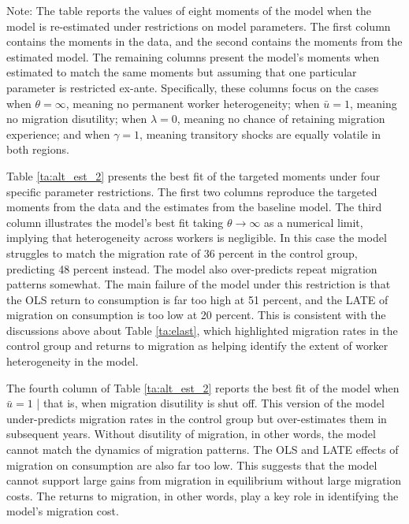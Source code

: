\documentclass[12pt,pdftex]{article}
\begin{document}
\begin{table}[t]
\parbox[c]{6.75in}{\vspace{0.1cm}
{\footnotesize  Note: The table reports the values of eight moments of the model when the model is re-estimated under restrictions on model parameters. The first column contains the moments in the data, and the second contains the moments from the estimated model. The remaining columns present the model's moments when estimated to match the same moments but assuming that one particular parameter is restricted ex-ante. Specifically, these columns focus on the cases when $\theta = \infty$, meaning no permanent worker heterogeneity; when $\bar u = 1$, meaning no migration disutility; when  $\lambda = 0$, meaning no chance of retaining migration experience; and when $\gamma = 1$, meaning transitory shocks are equally volatile in both regions.}}
\end{table}













Table \ref{ta:alt_est_2} presents the best fit of the targeted moments under four specific parameter restrictions. The first two columns reproduce the targeted moments from the data and the estimates from the baseline model. The third column illustrates the model's best fit taking $\theta \rightarrow \infty$ as a numerical limit, implying that heterogeneity across workers is negligible. In this case the model struggles to match the migration rate of 36 percent in the control group, predicting 48 percent instead. The model also over-predicts repeat migration patterns somewhat. The main failure of the model under this restriction is that the OLS return to consumption is far too high at 51 percent, and the LATE of migration on consumption is too low at 20 percent. This is consistent with the discussions above about Table \ref{ta:elast}, which highlighted migration rates in the control group and returns to migration as helping identify the extent of worker heterogeneity in the model.

The fourth column of Table \ref{ta:alt_est_2} reports the best fit of the model when $\bar u = 1$ | that is, when migration disutility is shut off. This version of the model under-predicts migration rates in the control group but over-estimates them in subsequent years. Without disutility of migration, in other words, the model cannot match the dynamics of migration patterns. The OLS and LATE effects of migration on consumption are also far too low. This suggests that the model cannot support large gains from migration in equilibrium without large migration costs. The returns to migration, in other words, play a key role in identifying the model's migration cost.
\end{document}
